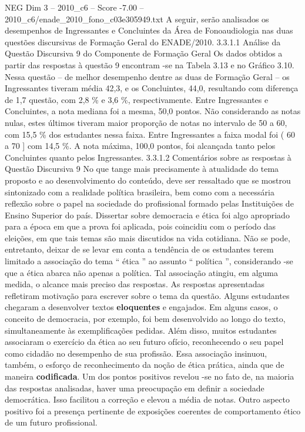 \begin{textsample}{NEG Dim 3 – 2010\_c6 – Score -7.00 – 2010\_c6/enade\_2010\_fono\_c03e305949.txt}
A seguir, serão analisados os desempenhos de Ingressantes e Concluintes da Área de Fonoaudiologia nas duas questões discursivas de Formação Geral do ENADE/2010. 3.3.1.1 Análise da Questão Discursiva 9 do Componente de Formação Geral Os dados obtidos a partir das respostas à questão 9 encontram -se na Tabela 3.13 e no Gráfico 3.10.
Nessa questão – de melhor desempenho dentre as duas de Formação Geral – os Ingressantes tiveram média 42,3, e os Concluintes, 44,0, resultando com diferença de 1,7 questão, com 2,8 \% e 3,6 \%, respectivamente.
Entre Ingressantes e Concluintes, a nota mediana foi a mesma, 50,0 pontos.
Não considerando as notas nulas, estes últimos tiveram maior proporção de notas no intervalo de 50 a 60, com 15,5 \% dos estudantes nessa faixa.
Entre Ingressantes a faixa modal foi ( 60 a 70 ] com 14,5 \%.
A nota máxima, 100,0 pontos, foi alcançada tanto pelos Concluintes quanto pelos Ingressantes. 3.3.1.2 Comentários sobre as respostas à Questão Discursiva 9 No que tange mais precisamente à atualidade do tema proposto e ao desenvolvimento do conteúdo, deve ser ressaltado que se mostrou sintonizado com a realidade política brasileira, bem como com a necessária reflexão sobre o papel na sociedade do profissional formado pelas Instituições de Ensino Superior do país.
Dissertar sobre democracia e ética foi algo apropriado para a época em que a prova foi aplicada, pois coincidiu com o período das eleições, em que tais temas são mais discutidos na vida cotidiana.
Não se pode, entretanto, deixar de se levar em conta a tendência de os estudantes terem limitado a associação do tema “ ética ” ao assunto “ política ”, considerando -se que a ética abarca não apenas a política.
Tal associação atingiu, em alguma medida, o alcance mais preciso das respostas.
As respostas apresentadas refletiram motivação para escrever sobre o tema da questão.
Alguns estudantes chegaram a desenvolver textos \textbf{eloquentes} e engajados.
Em alguns casos, o conceito de democracia, por exemplo, foi bem desenvolvido ao longo do texto, simultaneamente às exemplificações pedidas.
Além disso, muitos estudantes associaram o exercício da ética ao seu futuro ofício, reconhecendo o seu papel como cidadão no desempenho de sua profissão.
Essa associação insinuou, também, o esforço de reconhecimento da noção de ética prática, ainda que de maneira \textbf{codificada}.
Um dos pontos positivos revelou -se no fato de, na maioria das respostas analisadas, haver uma preocupação em definir a sociedade democrática.
Isso facilitou a correção e elevou a média de notas.
Outro aspecto positivo foi a presença pertinente de exposições coerentes de comportamento ético de um futuro profissional.

\end{textsample}
